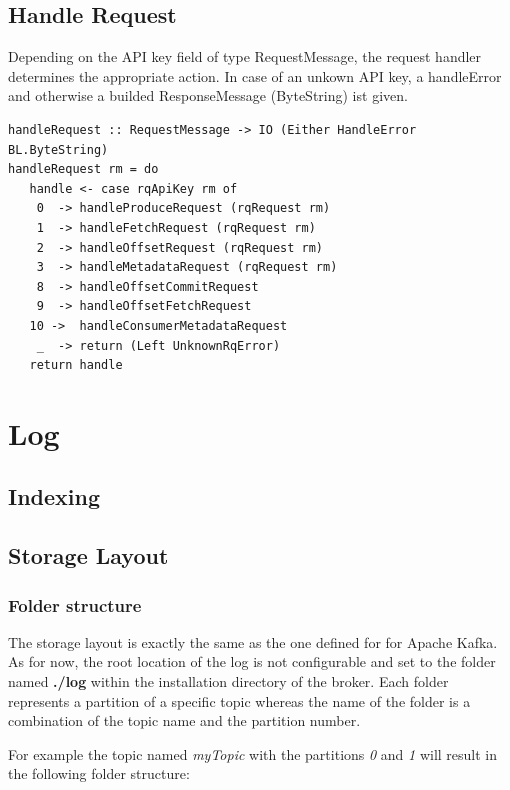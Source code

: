 \subsection{Handle Request}
Depending on the API key field of type RequestMessage, the request handler
determines the appropriate action. In case of an unkown API key, a handleError
and otherwise a builded ResponseMessage (ByteString) ist given. 

\begin{lstlisting}
handleRequest :: RequestMessage -> IO (Either HandleError BL.ByteString)
handleRequest rm = do
   handle <- case rqApiKey rm of
    0  -> handleProduceRequest (rqRequest rm)
    1  -> handleFetchRequest (rqRequest rm)
    2  -> handleOffsetRequest (rqRequest rm)
    3  -> handleMetadataRequest (rqRequest rm)
    8  -> handleOffsetCommitRequest 
    9  -> handleOffsetFetchRequest
   10 ->  handleConsumerMetadataRequest
    _  -> return (Left UnknownRqError)
   return handle
\end{lstlisting}

\section{Log}

\subsection{Indexing}

\subsection{Storage Layout}
\label{broker-storage}

\subsubsection{Folder structure}

The storage layout is exactly the same as the one defined for for Apache Kafka.
 As for now, the root location of the log is not configurable and
set to the folder named \textbf{./log} within the installation directory of the
broker. Each folder represents a partition of a specific topic whereas the name
of the folder is a combination of the topic name and the partition number. 

For example the topic named \textit{myTopic} with the partitions \textit{0} and
\textit{1} will result in the following folder structure:

